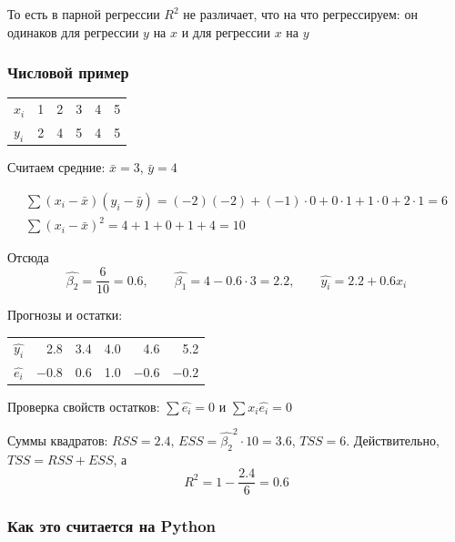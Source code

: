 \documentclass[12pt,a4paper]{article}
\numberwithin{equation}{section}
\theoremstyle{plain}
\theoremstyle{definition}
\theoremstyle{remark}
\begin{document}
То есть в парной регрессии $R^2$ не различает, что на что регрессируем: он одинаков для регрессии $y$ на $x$ и для регрессии $x$ на $y$

\subsubsection{Числовой пример}

\begin{table}[H]
    \centering
    \begin{tabular}{lrrrrr}
        \toprule
        $x_i$ & 1 & 2 & 3 & 4 & 5 \\
        $y_i$ & 2 & 4 & 5 & 4 & 5 \\
        \bottomrule
    \end{tabular}
\end{table}

Считаем средние: $\bar{x} = 3$, $\bar{y} = 4$

\begin{gather*}
    \sum \left(x_i - \bar{x}\right)\left(y_i - \bar{y}\right) = (-2)(-2) + (-1) \cdot 0 + 0 \cdot 1 + 1 \cdot 0 + 2 \cdot 1 = 6 \\
    \sum \left(x_i - \bar{x}\right)^2 = 4 + 1 + 0 + 1 + 4 = 10
\end{gather*}

Отсюда
$$
    \hat{\beta_2} = \frac{6}{10} = 0.6, \qquad
    \hat{\beta_1} = 4 - 0.6 \cdot 3 = 2.2, \qquad
    \hat{y_i} = 2.2 + 0.6 x_i
$$

Прогнозы и остатки:

\begin{table}[H]
    \centering
    \begin{tabular}{lrrrrr}
        \toprule
        $\hat{y_i}$ & 2.8    & 3.4 & 4.0 & 4.6    & 5.2    \\
        $\hat{e_i}$ & $-0.8$ & 0.6 & 1.0 & $-0.6$ & $-0.2$ \\
        \bottomrule
    \end{tabular}
\end{table}

Проверка свойств остатков: $\sum \hat{e_i} = 0$ и $\sum x_i \hat{e_i} = 0$

Суммы квадратов: $RSS = 2.4$, $ESS = \hat{\beta_2}^2 \cdot 10 = 3.6$, $TSS = 6$. Действительно, $TSS = RSS + ESS$, а
$$
    R^2 = 1 - \frac{2.4}{6} = 0.6
$$

\subsubsection{Как это считается на Python}
\end{document}
